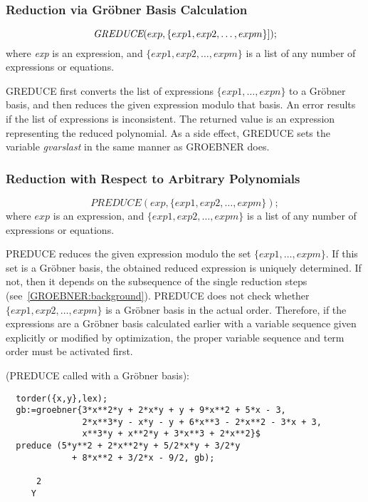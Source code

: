 \subsubsection{Reduction via Gr\"obner Basis Calculation}
\[
\mbox{\it  GREDUCE}(exp, \{exp1, exp2, \ldots , expm\}]);
\]
where {\it exp} is an expression, and $\{exp1, exp2,\ldots , expm\}$ is
a list of any number of expressions or equations.

GREDUCE first converts the list of expressions $\{exp1, \ldots ,
expn\}$ to a Gr\"obner basis, and then reduces the given expression
modulo that basis.  An error results if the list of expressions is
inconsistent. The returned value is an expression representing the
reduced polynomial. As a side effect, GREDUCE sets the variable {\it
gvarslast} in the same manner as GROEBNER does.


\subsubsection{Reduction with Respect to Arbitrary Polynomials}
\[
 PREDUCE(exp, \{exp1, exp2,\ldots , expm\});
\]
where $ exp $  is an expression, and $\{exp1, exp2, \ldots ,
expm \}$ is a list of any number of expressions or equations.

PREDUCE reduces the given expression modulo the set $\{exp1,
\ldots , expm\}$. If this set is a Gr\"obner basis, the obtained reduced
expression is uniquely determined. If not, then it depends on the
subsequence of the single reduction steps
(see~\ref{GROEBNER:background}). PREDUCE does not check whether
$\{exp1, exp2, \ldots , expm\}$ is a Gr\"obner basis in the actual
order. Therefore, if the expressions are a Gr\"obner basis calculated
earlier with a variable sequence given explicitly or modified by
optimization, the proper variable sequence and term order must
be activated first.

\example (PREDUCE called with a Gr\"obner basis):
\begin{verbatim}
  torder({x,y},lex);
  gb:=groebner{3*x**2*y + 2*x*y + y + 9*x**2 + 5*x - 3,
               2*x**3*y - x*y - y + 6*x**3 - 2*x**2 - 3*x + 3,
               x**3*y + x**2*y + 3*x**3 + 2*x**2}$
  preduce (5*y**2 + 2*x**2*y + 5/2*x*y + 3/2*y
             + 8*x**2 + 3/2*x - 9/2, gb);

      2
     Y
\end{verbatim}



